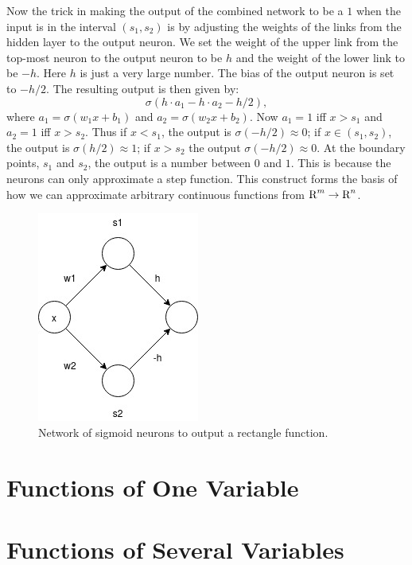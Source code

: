 Now the trick in making the output of the combined network to be a $1$ when the
input is in the interval $(s_1, s_2)$ is by adjusting the weights of the links
from the hidden layer to the output neuron. We set the weight of the upper link
from the top-most neuron to the output neuron to be $h$ and the weight of the
lower link to be $-h$. Here $h$ is just a very large number. The bias of the
output neuron is set to $-h/2$. The resulting output is then given by:
\[
    \sigma (h \cdot a_1 - h \cdot a_2 - h/2),
\]
where $a_1 = \sigma(w_1 x + b_1)$ and $a_2 = \sigma(w_2 x + b_2)$.
Now $a_1 = 1$ iff $x > s_1$ and $a_2 = 1$ iff $x > s_2$. Thus if $x < s_1$, 
the output is $\sigma(-h/2) \approx 0$; if $x \in (s_1, s_2)$, 
the output is $\sigma(h/2) \approx 1$; 
if $x > s_2$ the output $\sigma(-h/2) \approx 0$. 
At the boundary points, $s_1$ and $s_2$, 
the output is a number between $0$ and $1$. This is because the neurons 
can only approximate a step function. This construct forms the basis 
of how we can approximate arbitrary continuous functions from $\text{R}^m \to \text{R}^n$. 
\begin{figure}[ht]
\begin{center}
\includegraphics[scale=0.5]{RectFunction.jpg}
\end{center}
\caption{Network of sigmoid neurons to output a rectangle function.}
\label{fig:nn_rect_func}
\end{figure}

\section{Functions of One Variable}

\section{Functions of Several Variables}
